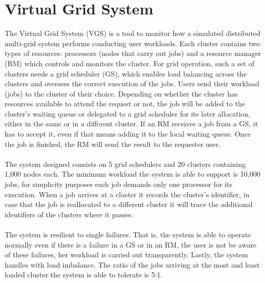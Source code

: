 \section{Virtual Grid System}
The Virtual Grid System (VGS) is a tool to monitor how a simulated distributed multi-grid system performs conducting user workloads. Each cluster contains two types of resources: processors (nodes that carry out jobs) and a resource manager (RM) which controls and monitors the cluster. For grid operation, such a set of clusters needs a grid scheduler (GS), which enables load balancing across the clusters and oversees the correct execution of the jobs. Users send their workload (jobs) to the cluster of their choice. Depending on whether the cluster has resources available to attend the request or not, the job will be added to the cluster's waiting queue or delegated to a grid scheduler for its later allocation, either in the same or in a different cluster. If an RM receives a job from a GS, it has to accept it, even if that means adding it to the local waiting queue. Once the job is finished, the RM will send the result to the requester user. 
\\\\
The system designed consists on 5 grid schedulers and 20 clusters containing 1,000 nodes each. The minimum workload the system is able to support is 10,000 jobs, for simplicity purposes each job demands only one processor for its execution. When a job arrives at a cluster it records the cluster's identifier, in case that the job is reallocated to a different cluster it will trace the additional identifiers of the clusters where it passes.
\\\\
The system is resilient to single failures. That is, the system is able to operate normally even if there is a failure in a GS or in an RM, the user is not be aware of these failures, her workload is carried out transparently. Lastly, the system handles with load imbalance. The ratio of the jobs arriving at the most and least loaded cluster the system is able to tolerate is 5:1.
